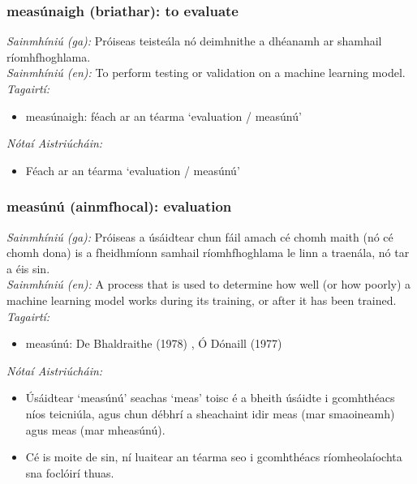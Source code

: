 \subsubsection*{measúnaigh (briathar): to evaluate}
 \noindent \textit{Sainmhíniú (ga):} Próiseas teisteála nó deimhnithe a dhéanamh ar shamhail ríomhfhoghlama.
\\
 \noindent \textit{Sainmhíniú (en):} To perform testing or validation on a machine learning model.
\\
 \noindent \textit{Tagairtí:}
\begin{itemize}
	\item measúnaigh: féach ar an téarma `evaluation / measúnú'
\end{itemize}

 \noindent \textit{Nótaí Aistriúcháin:}
\begin{itemize}
	\item Féach ar an téarma `evaluation / measúnú'
\end{itemize}


\subsubsection*{measúnú (ainmfhocal): evaluation}
 \noindent \textit{Sainmhíniú (ga):} Próiseas a úsáidtear chun fáil amach cé chomh maith (nó cé chomh dona) is a fheidhmíonn samhail ríomhfhoghlama le linn a traenála, nó tar a éis sin.
\\
 \noindent \textit{Sainmhíniú (en):} A process that is used to determine how well (or how poorly) a machine learning model works during its training, or after it has been trained.
\\
 \noindent \textit{Tagairtí:}
\begin{itemize}
	\item measúnú: De Bhaldraithe (1978) \cite{de-bhaldraithe}, Ó Dónaill (1977) \cite{odonaill}
\end{itemize}

 \noindent \textit{Nótaí Aistriúcháin:}
\begin{itemize}
	\item Úsáidtear `measúnú' seachas `meas' toisc é a bheith úsáidte i gcomhthéacs níos teicniúla, agus chun débhrí a sheachaint idir meas (mar smaoineamh) agus meas (mar mheasúnú).
	\item Cé is moite de sin, ní luaitear an téarma seo i gcomhthéacs ríomheolaíochta sna foclóirí thuas.
\end{itemize}


